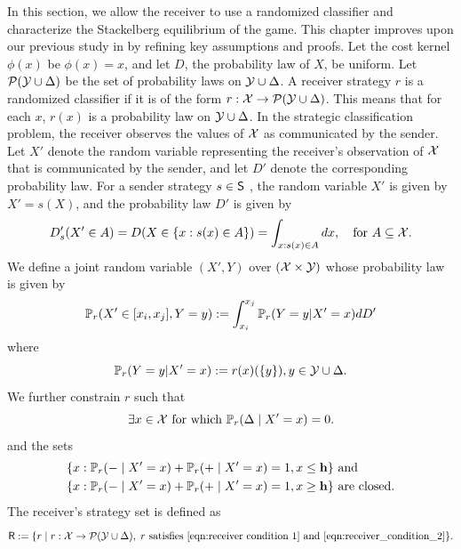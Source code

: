 In this section, we allow the receiver to use a randomized classifier and characterize the Stackelberg equilibrium of the game. This chapter improves upon our previous study in \cite{singh2024optimal} by refining key assumptions and proofs. Let the cost kernel  $\phi(x)$ be $\phi(x) = x$, and let $D$, the probability law of $X$, be uniform. Let $\mathcal{P}(\mathcal{Y} \cup \Delta)$ be the set of probability laws on $\mathcal{Y} \cup \Delta$. A receiver strategy $r$ is a randomized classifier if it is of the form $r: \mathcal{X} \to \mathcal{P}(\mathcal{Y} \cup \Delta)$. This means that for each $x$, $r(x)$ is a probability law on $\mathcal{Y} \cup \Delta$. In the strategic classification problem, the receiver observes the values of $\mathcal{X}$ as communicated by the sender. Let $X'$ denote the random variable representing the receiver's observation of $\mathcal{X}$ that is communicated by the sender, and let $D'$ denote the corresponding probability law. For a sender strategy $s \in \mathsf{S}$ , the random variable $X'$ is given by $X' = s(X)$, and the probability law $D'$ is given by
\[
D'_s(X' \in A) = D(X \in \{x : s(x) \in A\}) = \int_{x : s(x) \in A} dx, \quad \text{for } A \subseteq \mathcal{X}.
\]
We define a joint random variable $(X',Y)$ over $(\mathcal{X} \times \mathcal{Y})$ whose probability law is given by
\[\mathbb{P}_r(X' \in [x_i,x_j],Y=y) := \int_{x_i}^{x_j}\mathbb{P}_r(Y=y|X'=x)dD'
\]
where
\begin{equation}\label{eqn:conditional}
  \mathbb{P}_{r}(Y=y|X'=x) := r(x)(\{y\}), y \in \mathcal{Y}\cup \Delta.
\end{equation}
We further constrain $r$ such that
\begin{equation}\label{eqn:receiver condition 1}
    \exists x \in \mathcal{X} \text{ for which } \mathbb{P}_r(\Delta \mid X' = x) = 0.
\end{equation}
and the sets
\begin{equation}\label{eqn:receiver_condition_2}
\begin{aligned}
    &\{x : \mathbb{P}_r(- \mid X' = x) + \mathbb{P}_r(+ \mid X' = x) = 1, x \leq \mathbf{h}\} \text{ and } \\
    &\{x : \mathbb{P}_r(- \mid X' = x) + \mathbb{P}_r(+ \mid X' = x) = 1, x \geq \mathbf{h}\} \text{ are closed.}
\end{aligned}
\end{equation}
The receiver's strategy set is defined as
\begin{equation}\label{defn:stochastic_receiver}
	\mathsf{R} := \{r \mid r: \mathcal{X} \to \mathcal{P}(\mathcal{Y} \cup \Delta), \; r \text{ satisfies } \eqref{eqn:receiver condition 1} \text{ and } \eqref{eqn:receiver_condition_2}\}.
\end{equation}
